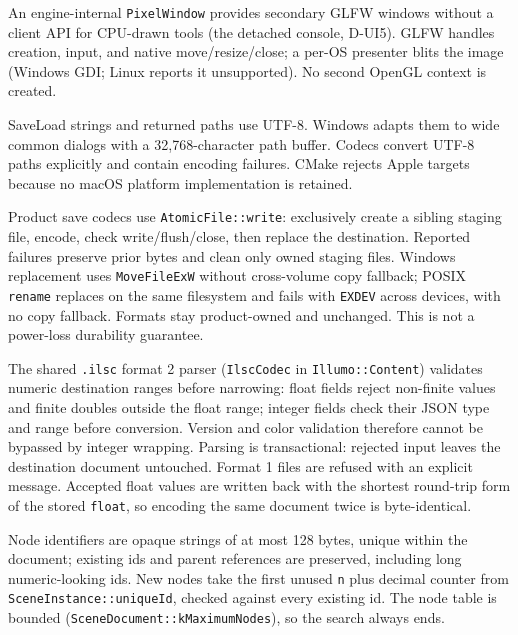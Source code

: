 An engine-internal \texttt{PixelWindow} provides secondary GLFW windows
without a client API for CPU-drawn tools (the detached console, D-UI5). GLFW
handles creation, input, and native move/resize/close; a per-OS presenter blits
the image (Windows GDI; Linux reports it unsupported). No second OpenGL
context is created.

SaveLoad strings and returned paths use UTF-8. Windows adapts them to wide common
dialogs with a 32,768-character path buffer. Codecs convert UTF-8 paths explicitly
and contain encoding failures. CMake rejects Apple targets because no macOS
platform implementation is retained.

Product save codecs use \texttt{AtomicFile::write}: exclusively create a sibling
staging file, encode, check write/flush/close, then replace the destination.
Reported failures preserve prior bytes and clean only owned staging files.
Windows replacement uses \texttt{MoveFileExW} without cross-volume copy fallback;
POSIX \texttt{rename} replaces on the same filesystem and fails with
\texttt{EXDEV} across devices, with no copy fallback. Formats stay
product-owned and unchanged. This is not a power-loss durability guarantee.

The shared \texttt{.ilsc} format 2 parser (\texttt{IlscCodec} in
\texttt{Illumo::Content}) validates numeric destination ranges before
narrowing: float fields reject non-finite values and finite doubles outside the
float range; integer fields check their JSON type and range before conversion.
Version and color validation therefore cannot be bypassed by integer wrapping.
Parsing is transactional: rejected input leaves the destination document
untouched. Format 1 files are refused with an explicit message. Accepted float
values are written back with the shortest round-trip form of the stored
\texttt{float}, so encoding the same document twice is byte-identical.

Node identifiers are opaque strings of at most 128 bytes, unique within the
document; existing ids and parent references are preserved, including long
numeric-looking ids. New nodes take the first unused \texttt{n} plus decimal
counter from \texttt{SceneInstance::uniqueId}, checked against every existing
id. The node table is bounded (\texttt{SceneDocument::kMaximumNodes}), so the
search always ends.

